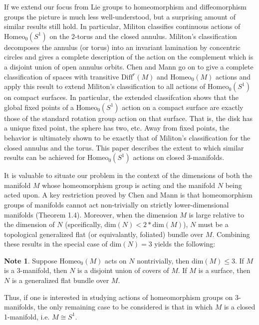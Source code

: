 \documentclass[10pt, oneside]{article}
\newcommand{\homeo}[1][S^1]{\text{Homeo}_0(#1)}
\newcommand{\diffr}[1][M]{\text{Diff}^r(#1)}
\newcommand{\dimn}[1]{\text{dim}(#1)}
\theoremstyle{definition}
\newtheorem*{note*}{Note}
\theoremstyle{definition}
\begin{document}
If we extend our focus from Lie groups to homeomorphism and diffeomorphism groups the picture is much less well-understood, but a surprising amount of similar results still hold. In particular, Militon \cite{militon:ActionsGroup} classifies continuous actions of $\homeo$ on the 2-torus and the closed annulus. Militon's classification decomposes the annulus (or torus) into an invariant lamination by concentric circles and gives a complete description of the action on the complement which is a disjoint union of open annulus orbits. Chen and Mann \cite{chen:StructureTheorems} go on to give a complete classification of spaces with transitive $\diffr$ and $\homeo[M]$ actions and apply this result to extend Militon's classification to all actions of $\homeo$ on compact surfaces. In particular, the extended classifcation shows that the global fixed points of a $\homeo$ action on a compact surface are exactly those of the standard rotation group action on that surface. That is, the disk has a unique fixed point, the sphere has two, etc. Away from fixed points, the behavior is ultimately shown to be exactly that of Militon's classification for the closed annulus and the torus. This paper describes the extent to which similar results can be achieved for $\homeo$ actions on closed 3-manifolds.

It is valuable to situate our problem in the context of the dimensions of both the manifold $M$ whose homeomorphism group is acting and the manifold $N$ being acted upon. A key restriction proved by Chen and Mann \cite{chen:StructureTheorems} is that homeomorphism groups of manifolds cannot act non-trivially on strictly lower-dimensional manifolds (Theorem 1.4). Moreover, when the dimension $M$ is large relative to the dimension of $N$ (spceifically, $\dimn{N} < 2*\dimn{M}$), $N$ must be a topological generalized flat (or equivalantly, foliated) bundle over $M$. Combining these results in the special case of $\dimn{N} = 3$ yields the following:
\begin{note*}
    Suppose $\homeo[M]$ acts on $N$ nontrivially, then $\dimn{M}\leq 3$. If $M$ is a 3-manifold, then $N$ is a disjoint union of covers of $M$. If $M$ is a surface, then $N$ is a generalized flat bundle over $M$.
\end{note*}
\noindent Thus, if one is interested in studying actions of homeomorphism groups on 3-manifolds, the only remaining case to be considered is that in which $M$ is a closed 1-manifold, i.e. $M\cong S^1$.
\end{document}
